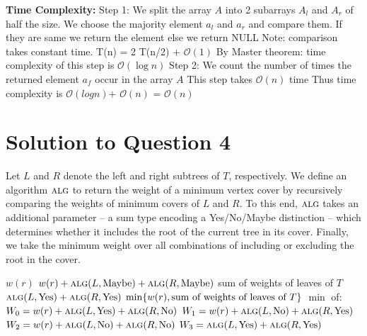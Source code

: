 \documentclass[11pt]{article}
\renewcommand{\O}{\mathcal{O}}
\newcommand{\alg}{\textsc{alg}}
\begin{document}
{\bf Time Complexity:}\newline
Step 1: We split the array $A$ into 2 subarrays $A_l$ and $A_r$ of half the size. We choose the majority element $a_l$ and $a_r$
and compare them. If they are same we return the element else we return NULL\newline
Note: comparison takes constant time.\newline
T(n) = 2 T(n/2) + $\O(1)$ \newline
By Master theorem: time complexity of this step is $\O(\log n)$ \newline
Step 2: We count the number of times the returned element $a_f$ occur in the array $A$ \newline
This step takes $\O(n)$ time \newline
Thus time complexity is $\O(log n)$+ $\O(n)$ \newline
= $\O(n)$


\section{Solution to Question 4}

\noindent Let $L$ and $R$ denote the left and right subtrees of $T$, respectively.
We define an algorithm $\alg$ to return the weight of a minimum vertex cover by recursively comparing the weights of minimum covers of $L$ and $R$.
To this end, $\alg$ takes an additional parameter -- a sum type encoding a Yes/No/Maybe distinction -- which determines whether it includes the root of the current tree in its cover.
Finally, we take the minimum weight over all combinations of including or excluding the root in the cover.

\begin{algorithmic}
        \State \Return $w(r)$
      \Else
      \State \Return $w(r) + \alg(L, \operatorname{Maybe}) + \alg(R, \operatorname{Maybe})$
      \EndIf
        \State \Return sum of weights of leaves of $T$
      \Else
        \State \Return $\alg(L, \operatorname{Yes}) + \alg(R, \operatorname{Yes})$
      \EndIf
        \State \Return $\min\{w(r), \textnormal{sum of weights of leaves of } T\}$
      \Else
        \State \Return $\min$ of:
        \State \hspace{7em} $W_0 = w(r) + \alg(L, \operatorname{Yes}) + \alg(R, \operatorname{No})$
        \State \hspace{7em} $W_1 = w(r) + \alg(L, \operatorname{No}) + \alg(R, \operatorname{Yes})$
        \State \hspace{7em} $W_2 = w(r) + \alg(L, \operatorname{No}) + \alg(R, \operatorname{No})$
        \State \hspace{7em} $W_3 = \alg(L, \operatorname{Yes}) + \alg(R, \operatorname{Yes})$
      \EndIf
    \EndIf
  \EndFunction
\end{algorithmic}
\end{document}
